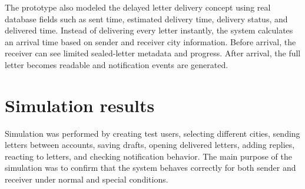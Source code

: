 ﻿\documentclass[12pt,a4paper]{report}
\begin{document}
The prototype also modeled the delayed letter delivery concept using real database fields such as sent time, estimated delivery time, delivery status, and delivered time. Instead of delivering every letter instantly, the system calculates an arrival time based on sender and receiver city information. Before arrival, the receiver can see limited sealed-letter metadata and progress. After arrival, the full letter becomes readable and notification events are generated.

\section{Simulation results}

Simulation was performed by creating test users, selecting different cities, sending letters between accounts, saving drafts, opening delivered letters, adding replies, reacting to letters, and checking notification behavior. The main purpose of the simulation was to confirm that the system behaves correctly for both sender and receiver under normal and special conditions.
\end{document}
